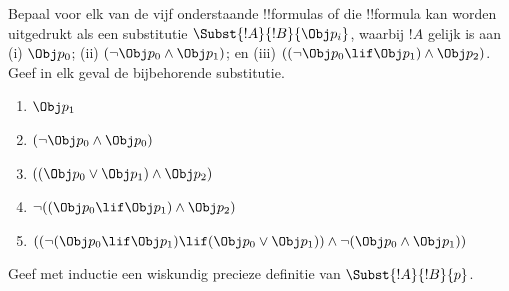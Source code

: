 \documentclass[../../../include/open-logic-section]{subfiles}
\begin{document}
\begin{prob} Bepaal voor elk van de vijf onderstaande !!{formula}s of
 die !!{formula} kan worden uitgedrukt als een substitutie
 \( \Subst{!A}{!B}{\Obj p_i} \), waarbij \( !A \) gelijk is aan (i)
 \( \Obj p_0 \); (ii) \( ( \lnot \Obj p_0 \land \Obj p_1) \); en (iii)
 \( ( ( \lnot \Obj p_0 \lif \Obj p_1 ) \land \Obj p_2 ) \). Geef in
  elk geval de bijbehorende substitutie.
  \begin{enumerate}
    \item \( \Obj p_1 \) 
    \item \( ( \lnot \Obj p_0 \land \Obj p_0 ) \)
    \item \( ( ( \Obj p_0 \lor \Obj p_1 ) \land \Obj p_2 )  \)
    \item \( \lnot ( ( \Obj p_0 \lif \Obj p_1 ) \land \Obj p_2 ) \)
    \item \( (( \lnot ( \Obj p_0 \lif \Obj p_1 ) \lif ( \Obj p_0 \lor \Obj p_1 )) \land \lnot ( \Obj p_0 \land \Obj p_1 )) \)
  \end{enumerate}
\end{prob}

\begin{prob}
Geef met inductie een wiskundig precieze definitie van
$\Subst{!A}{!B}{p}$.
\end{prob}
\end{document}
